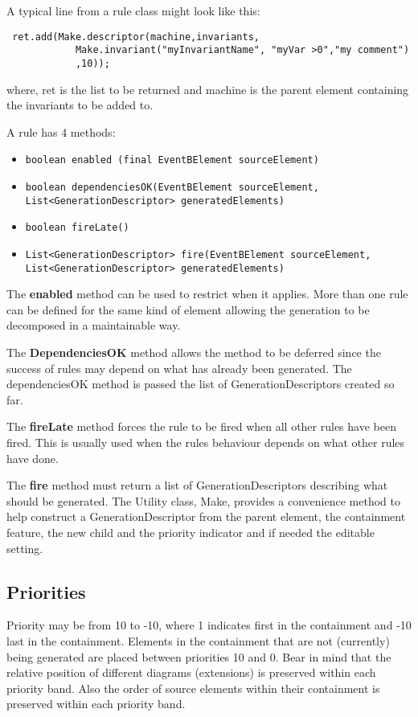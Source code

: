 A typical line from a rule class might look like this:
 \begin{verbatim}
 ret.add(Make.descriptor(machine,invariants,
			Make.invariant("myInvariantName", "myVar >0","my comment")
			,10));
 \end{verbatim}		
where,  ret is the list to be returned and machine is the parent element containing the invariants to be added to.

A rule has 4 methods:
\begin{itemize}
\item \texttt{boolean enabled (final EventBElement sourceElement)}
\item \texttt{boolean dependenciesOK(EventBElement sourceElement, \\  List<GenerationDescriptor> generatedElements)}
\item \texttt{boolean fireLate()}
\item \texttt{List<GenerationDescriptor> fire(EventBElement sourceElement, \\   List<GenerationDescriptor> generatedElements)}
\end{itemize}

The \textbf{enabled} method can be used to restrict when it applies. More than one rule can be defined for the same kind of element allowing the generation to be decomposed in a maintainable way. 

The \textbf{DependenciesOK} method allows the method to be deferred since the success of rules may depend on what has already been generated. The dependenciesOK method is passed the list of GenerationDescriptors created so far.

The \textbf{fireLate} method forces the rule to be fired when all other rules have been fired. This is usually used when the rules behaviour depends on what other rules have done.

The \textbf{fire} method must return a list of GenerationDescriptors describing what should be generated. The Utility class, Make, provides a convenience method to help construct a GenerationDescriptor from the parent element, the containment feature, the new child and the priority indicator and if needed the editable setting.

\subsection{Priorities}
\label{sec:priorities}

Priority may be from 10 to -10, where 1 indicates first in the containment and -10 last in the containment. Elements in the containment that are not (currently) being generated are placed between priorities 10 and 0. Bear in mind that the relative position of different diagrams (extensions) is preserved within each priority band. Also the order of source elements within their containment is preserved within each priority band.

